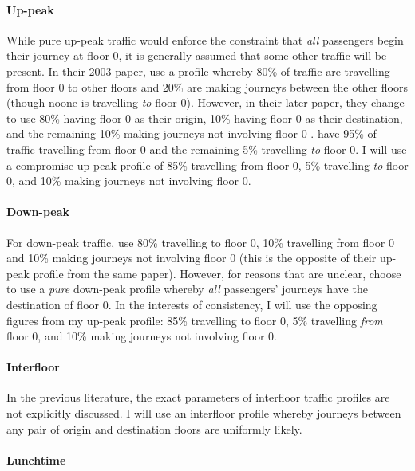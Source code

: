 \documentclass{UoYCSproject}
\begin{document}
\paragraph{Up-peak}

While pure up-peak traffic would enforce the constraint that \textit{all} passengers begin their journey at floor 0, it is generally assumed that some other traffic will be present.  In their 2003 paper, \citet{Nikovski2003} use a profile whereby 80\% of traffic are travelling from floor 0 to other floors and 20\% are making journeys between the other floors (though noone is travelling \textit{to} floor 0).  However, in their later paper, they change to use 80\% having floor 0 as their origin, 10\% having floor 0 as their destination, and the remaining 10\% making journeys not involving floor 0 \citep{Brand2004}.  \citet{Rong2003} have 95\% of traffic travelling from floor 0 and the remaining 5\% travelling \textit{to} floor 0.  I will use a compromise up-peak profile of 85\% travelling from floor 0, 5\% travelling \textit{to} floor 0, and 10\% making journeys not involving floor 0.

\paragraph{Down-peak}

For down-peak traffic, \citet{Brand2004} use 80\% travelling to floor 0, 10\% travelling from floor 0 and 10\% making journeys not involving floor 0 (this is the opposite of their up-peak profile from the same paper).  However, for reasons that are unclear, \citet{Rong2003} choose to use a \textit{pure} down-peak profile whereby \textit{all} passengers' journeys have the destination of floor 0.  In the interests of consistency, I will use the opposing figures from my up-peak profile: 85\% travelling to floor 0, 5\% travelling \textit{from} floor 0, and 10\% making journeys not involving floor 0.

\paragraph{Interfloor}

In the previous literature, the exact parameters of interfloor traffic profiles are not explicitly discussed.  I will use an interfloor profile whereby journeys between any pair of origin and destination floors are uniformly likely.

\paragraph{Lunchtime}
\end{document}
